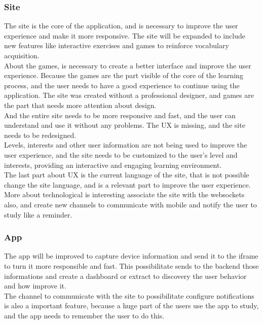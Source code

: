 \documentclass[12pt]{article}
\begin{document}
\subsubsection{Site}
The site is the core of the application, and is necessary to improve the user experience and make it more responsive. The site will be expanded to include new features like interactive exercises and games to reinforce vocabulary acquisition. \\
About the games, is necessary to create a better interface and improve the user experience. Because the games are the part visible of the core of the learning process, and the user needs to have a good experience to continue using the application. The site was created without a professional designer, and games are the part that needs more attention about design. \\
And the entire site needs to be more responsive and fast, and the user can understand and use it without any problems. The UX is missing, and the site needs to be redesigned. \\
Levels, interests and other user information are not being used to improve the user experience, and the site needs to be customized to the user's level and interests, providing an interactive and engaging learning environment. \\
The last part about UX is the current language of the site, that is not possible change the site language, and is a relevant part to improve the user experience. \\
More about technological is interesting associate the site with the websockets also, and create new channels to communicate with mobile and notify the user to study like a reminder. 

\subsubsection{App}
The app will be improved to capture device information and send it to the iframe to turn it more responsible and fast. This possibilitate sends to the backend those informations and create a dashboard or extract to discovery the user behavior and how improve it. \\
The channel to communicate with the site to possibilitate configure notifications is also a important feature, because a huge part of the users use the app to study, and the app needs to remember the user to do this. \\
\end{document}
